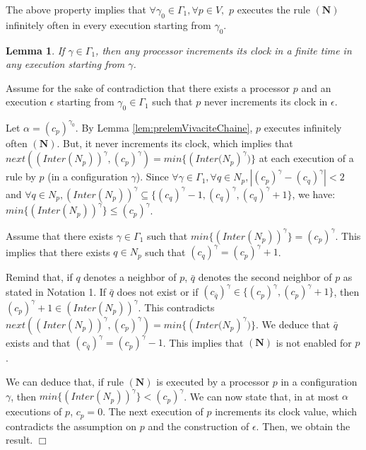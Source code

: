 \documentclass[11pt,english,letterpaper]{article}
\newtheorem{lemma}{Lemma}
\newenvironment{proof}{{\noindent\bf Proof. } }{{\hfill $\Box$}}
\begin{document}
The above property implies that  $\forall\gamma_{0}\in\Gamma_{1},\forall p\in V,$ $p$ executes the rule $\boldsymbol{(N)}$ infinitely often in every execution starting from $\gamma_{0}$.

\begin{lemma}\label{lem:vivaciteChaine}
If $\gamma\in\Gamma_{1}$, then any processor increments its clock in a finite time in any execution starting from $\gamma$.
\end{lemma}

\begin{proof}
Assume for the sake of contradiction that there exists a processor $p$ and an execution $\epsilon$ starting from $\gamma_{0}\in\Gamma_{1}$ such that $p$ never increments its clock in $\epsilon$.

Let $\alpha=\left(c_{p}\right)^{\gamma_{0}}$. By Lemma \ref{lem:prelemVivaciteChaine}, $p$ executes infinitely often $\boldsymbol{(N)}$. But, it never increments its clock, which implies that $next(\left(Inter(N_{p})\right)^{\gamma},\left(c_{p}\right)^{\gamma})=min\{\left(Inter(N_{p}\right)^{\gamma})\}$ at each execution of a rule by $p$ (in a configuration $\gamma$). Since $\forall\gamma\in\Gamma_{1},\forall q\in N_{p},|\left(c_{p}\right)^{\gamma}-\left(c_{q}\right)^{\gamma}|<2$ and $\forall q\in N_{p},\left(Inter(N_{p})\right)^{\gamma}\subseteq \{\left(c_{q}\right)^{\gamma}-1,\left(c_{q}\right)^{\gamma},\left(c_{q}\right)^{\gamma}+1\}$, we have:	$min\{\left(Inter(N_{p})\right)^{\gamma}\}\leq \left(c_{p}\right)^{\gamma}$.

Assume that there exists $\gamma\in\Gamma_{1}$ such that $min\{\left(Inter(N_{p})\right)^{\gamma}\}=\left(c_{p}\right)^{\gamma}$. This implies that there exists $q\in N_{p}$ such that $\left(c_{q}\right)^{\gamma}=\left(c_{p}\right)^{\gamma}+1$.

Remind that, if $q$ denotes a neighbor of $p$, $\bar{q}$ denotes the second neighbor of $p$ as stated in Notation 1. If $\bar{q}$ does not exist or if $\left(c_{\bar{q}}\right)^{\gamma}\in\{\left(c_{p}\right)^{\gamma},\left(c_{p}\right)^{\gamma}+1\}$, then  $\left(c_{p}\right)^{\gamma}+1\in\left(Inter(N_{p})\right)^{\gamma}$. This contradicts $next(\left(Inter(N_{p})\right)^{\gamma},\left(c_{p}\right)^{\gamma})=min\{\left(Inter(N_{p}\right)^{\gamma})\}$. We deduce that $\bar{q}$ exists and that $\left(c_{\bar{q}}\right)^{\gamma}=\left(c_{p}\right)^{\gamma}-1$. This implies that $\boldsymbol{(N)}$ is not enabled for $p$.

We can deduce that, if rule $\boldsymbol{(N)}$ is executed by a processor $p$ in a configuration $\gamma$, then  $min\{\left(Inter(N_{p})\right)^{\gamma}\}<\left(c_{p}\right)^{\gamma}$. We can now state that, in at most $\alpha$ executions of  $p$,  $c_{p}=0$. The next execution of $p$ increments its clock value, which contradicts the assumption on $p$ and the construction of $\epsilon$. Then, we obtain the result. 
\end{proof}
\end{document}
